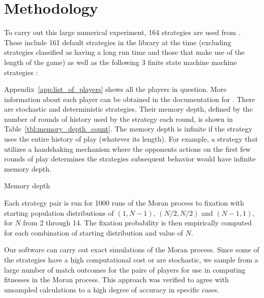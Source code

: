 \documentclass{article}
\begin{document}
\section{Methodology}\label{sec:methodology}

To carry out this large numerical experiment, 164 strategies are used from
\cite{axelrodproject}. These include 161 default strategies in the library at
the time (excluding strategies classified as having a long run time and those
that make use of the length of the game) as well as
the following 3 finite state machine machine strategies \cite{Ashlock2006}:


Appendix~\ref{app:list_of_players} shows all the players in question. More
information about each player can be obtained in the documentation for
\cite{axelrodproject}. There are stochastic and
deterministic strategies. Their memory
depth, defined by the number of rounds of history used by the strategy each round,
is shown in Table~\ref{tbl:memory_depth_count}. The memory depth is infinite if
the strategy uses the entire history of play (whatever its length). For example,
a strategy that utilizes a handshaking mechanism where the opponents actions
on the first few rounds of play determines the strategies subsequent behavior
would have infinite memory depth.

\begin{table}[!hbtp]
    \centering
        
        \caption{Memory depth}
        \label{tbl:memory_depth_count}
\end{table}

Each strategy pair is run for 1000 runs of the Moran process to fixation
with starting population distributions of $(1, N-1)$,
$(N/2, N/2)$ and $(N-1 , 1)$, for \(N\) from 2 through 14. The
fixation probability is then empirically computed for each combination of
starting distribution and value of \(N\).

Our software can carry out exact simulations of the Moran process. Since some of
the strategies have a high computational cost or are stochastic, we sample
from a large number of match outcomes for the pairs of players for use in computing
fitnesses in the Moran process. This approach was verified to agree with unsampled
calculations to a high degree of accuracy in specific cases.
\end{document}
